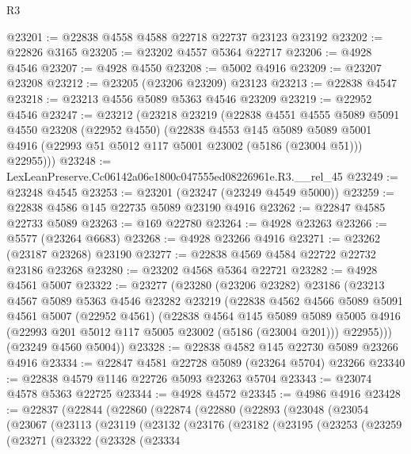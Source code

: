 \begin{lexlean}{R3}
\begin{coremodule}
@23201 := @22838 @4558 @4588 @22718 @22737 @23123 @23192
@23202 := @22826 @3165
@23205 := @23202 @4557 @5364 @22717
@23206 := @4928 @4546
@23207 := @4928 @4550
@23208 := @5002 @4916
@23209 := @23207 @23208
@23212 := @23205 (@23206 @23209) @23123
@23213 := @22838 @4547
@23218 := @23213 @4556 @5089 @5363 @4546 @23209
@23219 := @22952 @4546
@23247 := @23212
    (@23218
      @23219
      (@22838
        @4551
        @4555
        @5089
        @5091
        @4550
        @23208
        (@22952 @4550)
        (@22838
          @4553
          @145
          @5089
          @5089
          @5001
          @4916
          (@22993 @51 @5012 @117 @5001 @23002 (@5186 (@23004 @51)))
          @22955)))
@23248 := LexLeanPreserve.Cc06142a06e1800c047555ed08226961e.R3.__rel_45
@23249 := @23248 @4545
@23253 := @23201 (@23247 (@23249 @4549 @5000))
@23259 := @22838 @4586 @145 @22735 @5089 @23190 @4916
@23262 := @22847 @4585 @22733 @5089
@23263 := @169 @22780
@23264 := @4928 @23263
@23266 := @5577 (@23264 @6683)
@23268 := @4928 @23266 @4916
@23271 := @23262 (@23187 @23268) @23190
@23277 := @22838 @4569 @4584 @22722 @22732 @23186 @23268
@23280 := @23202 @4568 @5364 @22721
@23282 := @4928 @4561 @5007
@23322 := @23277
    (@23280
      (@23206 @23282)
      @23186
      (@23213
        @4567
        @5089
        @5363
        @4546
        @23282
        @23219
        (@22838
          @4562
          @4566
          @5089
          @5091
          @4561
          @5007
          (@22952 @4561)
          (@22838
            @4564
            @145
            @5089
            @5089
            @5005
            @4916
            (@22993 @201 @5012 @117 @5005 @23002 (@5186 (@23004 @201)))
            @22955)))
      (@23249 @4560 @5004))
@23328 := @22838 @4582 @145 @22730 @5089 @23266 @4916
@23334 := @22847 @4581 @22728 @5089 (@23264 @5704) @23266
@23340 := @22838 @4579 @1146 @22726 @5093 @23263 @5704
@23343 := @23074 @4578 @5363 @22725
@23344 := @4928 @4572
@23345 := @4986 @4916
@23428 := @22837
    (@22844
      (@22860
        (@22874
          (@22880
            (@22893
              (@23048
                (@23054
                  (@23067
                    (@23113
                      (@23119
                        (@23132
                          (@23176
                            (@23182
                              (@23195
                                (@23253
                                  (@23259
                                    (@23271
                                      (@23322
                                        (@23328
                                          (@23334

\end{coremodule}
\end{lexlean}

